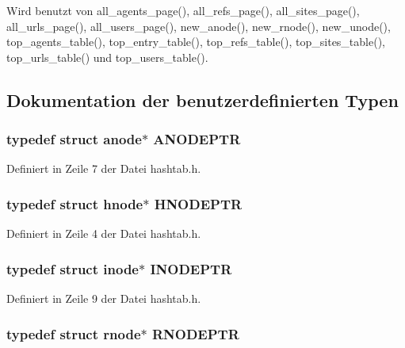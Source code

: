 Wird benutzt von all\_\-agents\_\-page(), all\_\-refs\_\-page(), all\_\-sites\_\-page(), all\_\-urls\_\-page(), all\_\-users\_\-page(), new\_\-anode(), new\_\-rnode(), new\_\-unode(), top\_\-agents\_\-table(), top\_\-entry\_\-table(), top\_\-refs\_\-table(), top\_\-sites\_\-table(), top\_\-urls\_\-table() und top\_\-users\_\-table().

\subsection{Dokumentation der benutzerdefinierten Typen}
\subsubsection{\setlength{\rightskip}{0pt plus 5cm}typedef struct {\bf anode}$\ast$ {\bf ANODEPTR}}\label{hashtab_8h_54e9f1564bf40998b62838a2b06f7798}




Definiert in Zeile 7 der Datei hashtab.h.
\subsubsection{\setlength{\rightskip}{0pt plus 5cm}typedef struct {\bf hnode}$\ast$ {\bf HNODEPTR}}\label{hashtab_8h_6e6c936395602fb2683ed0599131927b}




Definiert in Zeile 4 der Datei hashtab.h.
\subsubsection{\setlength{\rightskip}{0pt plus 5cm}typedef struct {\bf inode}$\ast$ {\bf INODEPTR}}\label{hashtab_8h_e88293572818a449e95993c4ccdba0a8}




Definiert in Zeile 9 der Datei hashtab.h.
\subsubsection{\setlength{\rightskip}{0pt plus 5cm}typedef struct {\bf rnode}$\ast$ {\bf RNODEPTR}}\label{hashtab_8h_f93974994603709dc7ef7a9c6798fa23}




